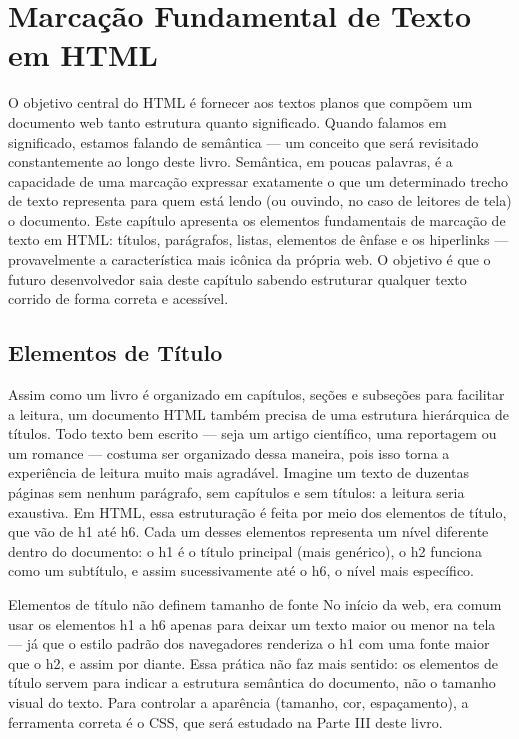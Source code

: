 \chapter{Marcação Fundamental de Texto em HTML}

O objetivo central do HTML é fornecer aos textos planos que compõem um documento web tanto estrutura quanto significado. Quando falamos em significado, estamos falando de semântica — um conceito que será revisitado constantemente ao longo deste livro. Semântica, em poucas palavras, é a capacidade de uma marcação expressar exatamente o que um determinado trecho de texto representa para quem está lendo (ou ouvindo, no caso de leitores de tela) o documento. Este capítulo apresenta os elementos fundamentais de marcação de texto em HTML: títulos, parágrafos, listas, elementos de ênfase e os hiperlinks — provavelmente a característica mais icônica da própria web. O objetivo é que o futuro desenvolvedor saia deste capítulo sabendo estruturar qualquer texto corrido de forma correta e acessível.

\section{Elementos de Título}

Assim como um livro é organizado em capítulos, seções e subseções para facilitar a leitura, um documento HTML também precisa de uma estrutura hierárquica de títulos. Todo texto bem escrito — seja um artigo científico, uma reportagem ou um romance — costuma ser organizado dessa maneira, pois isso torna a experiência de leitura muito mais agradável. Imagine um texto de duzentas páginas sem nenhum parágrafo, sem capítulos e sem títulos: a leitura seria exaustiva. Em HTML, essa estruturação é feita por meio dos elementos de título, que vão de h1 até h6. Cada um desses elementos representa um nível diferente dentro do documento: o h1 é o título principal (mais genérico), o h2 funciona como um subtítulo, e assim sucessivamente até o h6, o nível mais específico.

\begin{infobox}{Elementos de título não definem tamanho de fonte}
No início da web, era comum usar os elementos h1 a h6 apenas para deixar um texto maior ou menor na tela — já que o estilo padrão dos navegadores renderiza o h1 com uma fonte maior que o h2, e assim por diante. Essa prática não faz mais sentido: os elementos de título servem para indicar a estrutura semântica do documento, não o tamanho visual do texto. Para controlar a aparência (tamanho, cor, espaçamento), a ferramenta correta é o CSS, que será estudado na Parte III deste livro.
\end{infobox}

